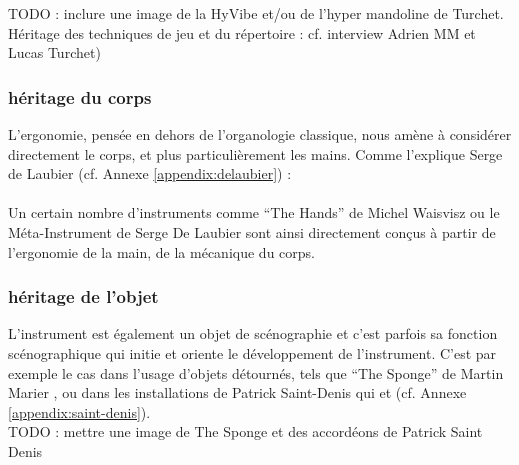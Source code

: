 TODO : inclure une image de la HyVibe et/ou de l'hyper mandoline de Turchet.\\
Héritage des techniques de jeu et du répertoire : cf. interview Adrien MM et Lucas Turchet) 


\subsubsection{héritage du corps}
\noindent L'ergonomie, pensée en dehors de l'organologie classique, nous amène à considérer directement le corps, et plus particulièrement les mains. Comme l'explique Serge de Laubier (cf. Annexe \ref{appendix:delaubier}) :\\
\\

Un certain nombre d'instruments comme ``The Hands'' de Michel Waisvisz ou le Méta-Instrument de Serge De Laubier sont ainsi directement conçus à partir de l'ergonomie de la main, de la mécanique du corps.

\subsubsection{héritage de l'objet}

\noindent L'instrument est également un objet de scénographie et c'est parfois sa fonction scénographique qui initie et oriente le développement de l'instrument. C'est par exemple le cas dans l'usage d'objets détournés, tels que ``The Sponge'' de Martin Marier \cite{marier_sponge_2010}, ou dans les installations de Patrick Saint-Denis qui  et  (cf. Annexe \ref{appendix:saint-denis}).\\

TODO : mettre une image de The Sponge et des accordéons de Patrick Saint Denis

